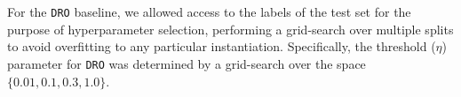 For the \texttt{DRO} baseline, we allowed access to the labels of the test set for the purpose of
hyperparameter selection, performing a grid-search over multiple splits to avoid overfitting to any
particular instantiation. Specifically, the threshold ($\eta$) parameter for \texttt{DRO} was
determined by a grid-search over the space $\{0.01, 0.1, 0.3, 1.0\}$.


